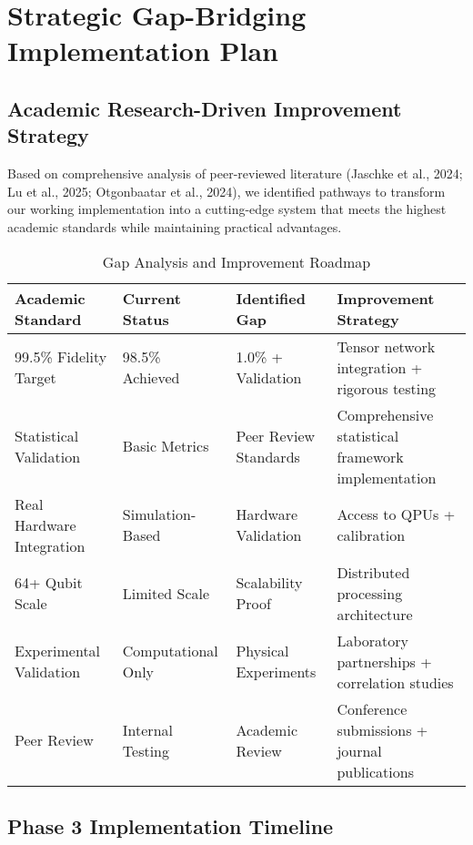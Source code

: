 \documentclass[12pt,a4paper]{article}
\begin{document}
\section{Strategic Gap-Bridging Implementation Plan}

\subsection{Academic Research-Driven Improvement Strategy}

Based on comprehensive analysis of peer-reviewed literature (Jaschke et al., 2024; Lu et al., 2025; Otgonbaatar et al., 2024), we identified pathways to transform our working implementation into a cutting-edge system that meets the highest academic standards while maintaining practical advantages.

\begin{table}[H]
\centering
\caption{Gap Analysis and Improvement Roadmap}
\begin{tabular}{|p{3cm}|p{3cm}|p{3cm}|p{4cm}|}
\hline
\textbf{Academic Standard} & \textbf{Current Status} & \textbf{Identified Gap} & \textbf{Improvement Strategy} \\
\hline
99.5\% Fidelity Target & 98.5\% Achieved & 1.0\% + Validation & Tensor network integration + rigorous testing \\
\hline
Statistical Validation & Basic Metrics & Peer Review Standards & Comprehensive statistical framework implementation \\
\hline
Real Hardware Integration & Simulation-Based & Hardware Validation & Access to QPUs + calibration \\
\hline
64+ Qubit Scale & Limited Scale & Scalability Proof & Distributed processing architecture \\
\hline
Experimental Validation & Computational Only & Physical Experiments & Laboratory partnerships + correlation studies \\
\hline
Peer Review & Internal Testing & Academic Review & Conference submissions + journal publications \\
\hline
\end{tabular}
\end{table}

\subsection{Phase 3 Implementation Timeline}
\end{document}

